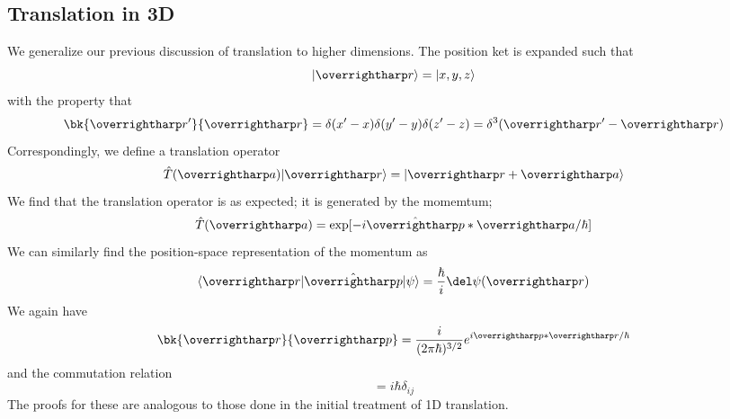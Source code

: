 \subsection{Translation in 3D}
We generalize our previous discussion of translation to higher dimensions. The position ket is expanded such that
\[\k{\vv r} = \k{x,y,z}\]
with the property that
\[\bk{\vv r'}{\vv r}= \delta(x'-x)\delta(y'-y)\delta(z'-z) = \delta^3(\vv r' - \vv r)\]
Correspondingly, we define a translation operator
\[\hat T(\vv a)\k{\vv r} = \k{\vv r +\vv a}\]
We find that the translation operator is as expected; it is generated by the momemtum;
\begin{equation}
	\hat T(\vv a) = \exp[-i\hat{\vv p} * \vv a /\hbar]
\end{equation}
We can similarly find the position-space representation of the momentum as
\begin{equation}
	\b{\vv r} \hat{\vv p}\k\p = \frac{\hbar}{i}\del\p(\vv r)
\end{equation}
We again have
\begin{equation}
	\bk{\vv r}{\vv p} = \frac{i}{(2\pi\hbar)^{3/2}} e^{i\vv p*\vv r/\hbar}
\end{equation}
and the commutation relation
\begin{equation}
	[\hat x_i,\hat p_j] = i\hbar \delta_{ij}
\end{equation}
The proofs for these are analogous to those done in the initial treatment of 1D translation.

